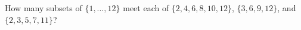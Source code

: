 How many subsets of $\{1,\ldots,12\}$ meet each of $\{2,4,6,8,10,12\}$, $\{3,6,9,12\}$, and $\{2,3,5,7,11\}$?
